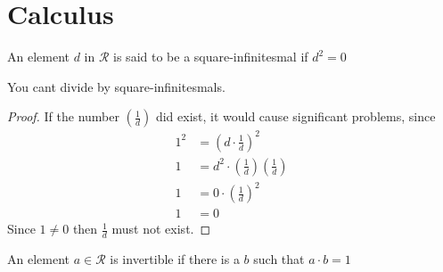 \chapter{Calculus}
\begin{definition}
  An element $d$ in $\mathcal{R}$ is said to be a square-infinitesmal if $d^2=0$
\end{definition}
\begin{lemma}
  You cant divide by square-infinitesmals.
\end{lemma}
\begin{proof}
  If the number $(\frac{1}{d})$ did exist, it would cause significant problems, since
  \begin{align*}
    1^2 &=\left(d \cdot \frac{1}{d}\right)^2\\
    1&=d^2\cdot \left(\frac{1}{d}\right)\left(\frac{1}{d}\right)\\
    1&=0\cdot \left(\frac{1}{d}\right)^2\\
    1&=0
  \end{align*}
  Since $1\neq 0$ then $\frac{1}{d}$ must not exist.
\end{proof}
\begin{definition}[Invertibility]
  An element $a \in \mathcal{R}$ is invertible if there is a $b$ such that $a\cdot b =1$
\end{definition}

